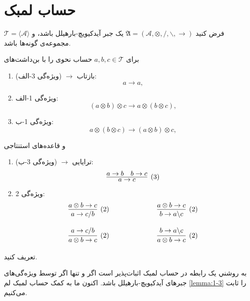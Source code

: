 \section{حساب لمبک}

فرض کنید 
$\mathfrak{A} = (\mathcal{A}, \otimes, /, \backslash, \rightarrow)$
یک جبر آیدکیویچ-بارهیلل باشد، و
$\mathcal{T} = \langle \mathcal{A} \rangle$
مجموعه‌ی گونه‌ها باشد.
\begin{definition}
برای
$a, b, c \in \mathcal{T}$
حساب نحوی را با بن‌داشت‌های
\begin{enumerate}
\item
بازتاب 
$\rightarrow$
(ویژه‌گی 3-الف):
$$ a \rightarrow a, $$
\item
ویژه‌گی 1-الف:
$$ (a \otimes b) \otimes c \rightarrow a \otimes (b \otimes c), $$
\item
ویژه‌گی 1-ب:
$$ a \otimes (b \otimes c) \rightarrow (a \otimes b) \otimes c, $$
\end{enumerate}
و قاعده‌های استنتاجی 
\begin{enumerate}
\item
ترایایی 
$\rightarrow$
(ویژه‌گی 3-ب):
$$
\infer[(3)]{a \rightarrow c}{a \rightarrow b & b \rightarrow c}
$$
\item
ویژه‌گی 2:
$$
\begin{matrix}
\infer[(2)]{a \rightarrow c / b}{a \otimes b \rightarrow c}
\hspace{3em} & \hspace{3em}
\infer[(2)]{b \rightarrow a \backslash c}{a \otimes b \rightarrow c}
\\ \vspace{0.1em} \\
\infer[(2)]{a \otimes b \rightarrow c}{a \rightarrow c / b}
\hspace{3em} & \hspace{3em}
\infer[(2)]{a \otimes b \rightarrow c}{b \rightarrow a \backslash c}
\end{matrix}
$$
\end{enumerate}
تعریف کنید.
\end{definition}

به روشني یک رابطه در حساب لمبک اثبات‌پذیر است اگر و تنها اگر توسط ویژه‌گی‌های جبرهای آیدکیویچ-بارهیلل باشد.
اکنون ما به کمک حساب لمبک لم
\ref{lemma:1-3}
را ثابت می‌کنیم.


